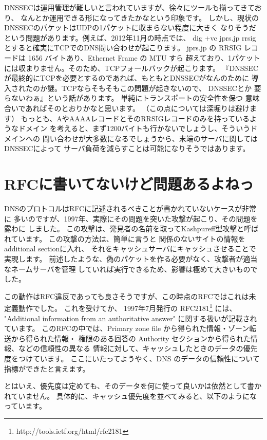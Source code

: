 DNSSECは運用管理が難しいと言われていますが、徐々にツールも揃ってきており、
なんとか運用できる形になってきたかなという印象です。
しかし、現状のDNSSECのパケットはUDPの1パケットに収まらない程度に大きく
なりそうだという問題があります。例えば、2012年11月の時点では、 dig +vc jprs.jp rrsig 
とすると確実にTCPでのDNS問い合わせが起こります。
jprs.jp の RRSIG レコードは 1656 バイトあり、Ethernet Frame の MTU すら
超えており、1パケットには収まりません。そのため、TCPフォールバックが起こります。
『DNSSECが最終的にTCPを必要とするのであれば、もともとDNSSECがなんのために
導入されたのか謎。TCPならそもそもこの問題が起きないので、 DNSSECとか
要らないわぁ』という話があります。 単純にトランスポートの安全性を保つ
意味合いであればそのとおりかなと思います。
（この点については深堀りは避けます）
もっとも、AやAAAAレコードとそのRRSIGレコードのみを持っているようなドメイン
を考えると、まず1200バイトも行かないでしょうし、そういうドメインへの
問い合わせが大多数になるでしょうから、末端のサーバに関してはDNSSECによって
サーバ負荷を減らすことは可能になりそうではあります。


\section{RFCに書いてないけど問題あるよねっ}
DNSのプロトコルはRFCに記述されるべきことが書かれていないケースが非常に
多いのですが、1997年、実際にその問題を突いた攻撃が起こり、その問題を露わに
しました。
この攻撃は、発見者の名前を取ってKashpureff型攻撃と呼ばれています。
この攻撃の方法は、簡単に言うと 関係のないサイトの情報をadditional sectionに入れ、
それをキャッシュサーバにキャッシュさせることで実現します。
前述したような、偽のパケットを作る必要がなく、攻撃者が適当なネームサーバを管理
していれば実行できるため、影響は極めて大きいものでした。

この動作はRFC違反であっても良さそうですが、この時点のRFCではこれは未定義動作でした。
これを受けてか、 1997年7月発行の RFC2181\footnote{http://tools.ietf.org/html/rfc2181} には、
"Additional information from an authoritative answer" に関する扱いが記載されています。
このRFCの中では、Primary zone file から得られた情報・ゾーン転送から得られた情報・
権限のある回答の Authority セクションから得られた情報、などの信頼性の異なる
情報に対して、キャッシュしたときのデータの優先度をつけています。
ここにいたってようやく、DNS のデータの信頼性について指標ができたと言えます。

とはいえ、優先度は定めても、そのデータを何に使って良いかは依然として書かれていません。
具体的に、キャッシュ優先度を並べてみると、以下のようになっています。

